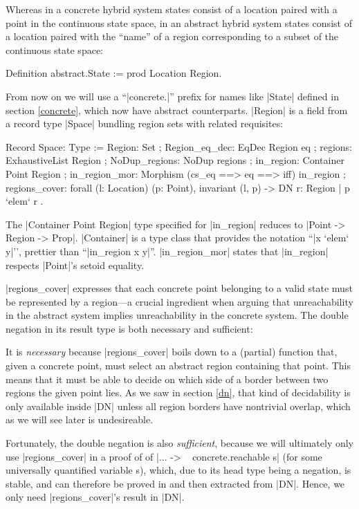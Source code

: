 \documentclass[runningheads]{llncs}
\begin{document}
Whereas in a concrete hybrid system states consist of a location paired with a point in the continuous state space, in an abstract hybrid system states consist of a location paired with the ``name'' of a region corresponding to a subset of the continuous state space:

\begin{code}
  Definition abstract.State := prod Location Region.
\end{code}
From now on we will use a ``|concrete.|'' prefix for names like |State| defined in section \ref{concrete}, which now have abstract counterparts. |Region| is a field from a record type |Space| bundling region sets with related requisites:
\begin{code}
  Record Space: Type :=
    { Region: Set
    ; Region_eq_dec: EqDec Region eq
    ; regions: ExhaustiveList Region
    ; NoDup_regions: NoDup regions
    ; in_region: Container Point Region
    ; in_region_mor: Morphism (cs_eq ==> eq ==> iff) in_region
    ; regions_cover: forall (l: Location) (p: Point),
        invariant (l, p) -> DN { r: Region | p `elem` r }
    }.
\end{code}
The |Container Point Region| type specified for |in_region| reduces to |Point -> Region -> Prop|. |Container| is a type class that provides the notation ``|x `elem` y|'', prettier than ``|in_region x y|''. |in_region_mor| states that |in_region| respects |Point|'s setoid equality.

|regions_cover| expresses that each concrete point belonging to a valid state must be represented by a region---a crucial ingredient when arguing that unreachability in the abstract system implies unreachability in the concrete system. The double negation in its result type is both necessary and sufficient:

It is \emph{necessary} because |regions_cover| boils down to a (partial) function that, given a concrete point, must select an abstract region containing that point. This means that it must be able to decide on which side of a border between two regions the given point lies. As we saw in section \ref{dn}, that kind of decidability is only available inside |DN| unless all region borders have nontrivial overlap, which as we will see later is undesireable.

Fortunately, the double negation is also \emph{sufficient}, because we will ultimately only use |regions_cover| in a proof of of |... -> ~ concrete.reachable s| (for some universally quantified variable s), which, due to its head type being a negation, is stable, and can therefore be proved in and then extracted from |DN|. Hence, we only need |regions_cover|'s result in |DN|.
\end{document}
